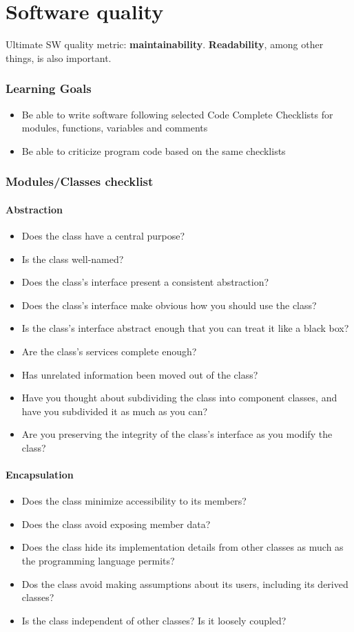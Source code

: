\part{Software quality}
Ultimate SW quality metric: \textbf{maintainability}. \textbf{Readability}, among other things, is also important.
\section{Learning Goals}
\begin{itemize}
\item Be able to write software following selected Code Complete Checklists for modules, functions, variables and comments
\item Be able to criticize program code based on the same checklists

\end{itemize}

\section{Modules/Classes checklist}
\subsection{Abstraction}
\begin{itemize}
\item Does the class have a central purpose?
\item Is the class well-named?
\item Does the class's interface present a consistent abstraction?
\item Does the class's interface make obvious how you should use the class?
\item Is the class's interface abstract enough that you can treat it like a black box?
\item Are the class's services complete enough? 
\item Has unrelated information been moved out of the class? 
\item Have you thought about subdividing the class into component classes, and have you subdivided it as much as you can?
\item Are you preserving the integrity of the class’s interface as you modify the class?
\end{itemize}

\subsection{Encapsulation}
\begin{itemize}
\item Does the class minimize accessibility to its members?
\item Does the class avoid exposing member data?
\item Does the class hide its implementation details from other classes as much as the programming language permits?
\item Dos the class avoid making assumptions about its users, including its derived classes?
\item Is the class independent of other classes? Is it loosely coupled?
\end{itemize}

